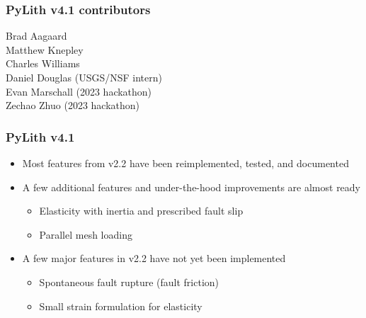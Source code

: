 \documentclass[aspectratio=169]{beamer}
\begin{document}
\begin{frame}
  \frametitle{PyLith v4.1 contributors}

  Brad Aagaard \\
  Matthew Knepley \\
  Charles Williams \\
  Daniel Douglas (USGS/NSF intern) \\
  Evan Marschall (2023 hackathon) \\
  Zechao Zhuo (2023 hackathon)
  
\end{frame}


\begin{frame}
  \frametitle{PyLith v4.1}
  \summary{}

  \begin{itemize}
  \item Most features from v2.2 have been reimplemented, tested, and documented
  \item A few additional features and under-the-hood improvements are almost ready
    \begin{itemize}
    \item Elasticity with inertia and prescribed fault slip
    \item Parallel mesh loading
    \end{itemize}
  \item A few major features in v2.2 have not yet been implemented
    \begin{itemize}
    \item Spontaneous fault rupture (fault friction)
    \item Small strain formulation for elasticity
    \end{itemize}    
  \end{itemize}

\end{frame}
\end{document}
